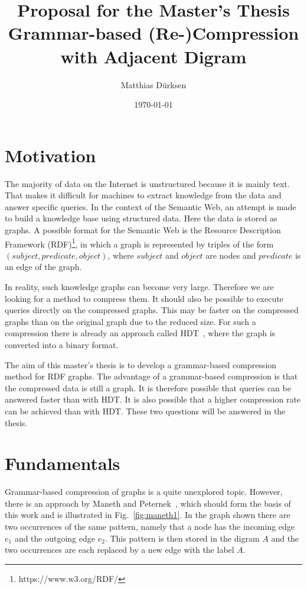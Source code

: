 \documentclass[a4paper]{scrartcl}
\title{Proposal for the Master's Thesis\\Grammar-based (Re-)Compression with Adjacent Digram}
\author{Matthias Dürksen}
\date{\today}
\begin{document}
\maketitle

\section{Motivation}\label{sec:motivation}

The majority of data on the Internet is unstructured because it is mainly text. That makes it difficult for machines to extract knowledge from the data and answer specific queries. In the context of the Semantic Web, an attempt is made to build a knowledge base using structured data. Here the data is stored as graphs. A possible format for the Semantic Web is the Resource Description Framework (RDF)\footnote{\label{foot:2}https://www.w3.org/RDF/}, in which a graph is represented by triples of the form $ (subject, predicate, object) $, where $ subject $ and $object$ are nodes and $predicate$ is an edge of the graph. 

In reality, such knowledge graphs can become very large. Therefore we are looking for a method to compress them. It should also be possible to execute queries directly on the compressed graphs. This may be faster on the compressed graphs than on the original graph due to the reduced size. For such a compression there is already an approach called HDT~\cite{hdt}, where the graph is converted into a binary format.

The aim of this master's thesis is to develop a grammar-based compression method for RDF graphs. The advantage of a grammar-based compression is that the compressed data is still a graph. It is therefore possible that queries can be answered faster than with HDT. It is also possible that a higher compression rate can be achieved than with HDT. These two questions will be answered in the thesis.


\section{Fundamentals}

Grammar-based compression of graphs is a quite unexplored topic. However, there is an approach by Maneth and Peternek~\cite{maneth}, which should form the basis of this work and is illustrated in Fig.~\ref{fig:maneth1}. In the graph shown there are two occurrences of the same pattern, namely that a node has the incoming edge $e_1$  and the outgoing edge $e_2$. This pattern is then stored in the digram $A$ and the two occurrences are each replaced by a new edge with the label $A$. 
\end{document}

